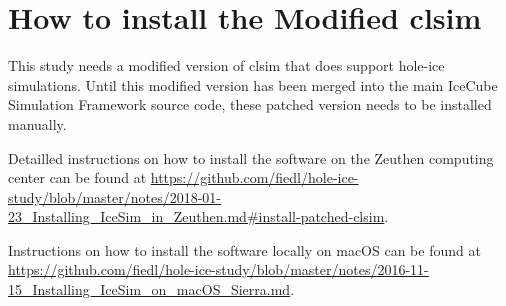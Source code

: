 
\section{How to install the Modified clsim}
\label{sec:howtoclsim}

This study needs a modified version of clsim that does support hole-ice simulations. Until this modified version has been merged into the main IceCube Simulation Framework source code, these patched version needs to be installed manually.


Detailled instructions on how to install the software on the Zeuthen computing center can be found at \url{https://github.com/fiedl/hole-ice-study/blob/master/notes/2018-01-23_Installing_IceSim_in_Zeuthen.md#install-patched-clsim}.

Instructions on how to install the software locally on macOS can be found at \url{https://github.com/fiedl/hole-ice-study/blob/master/notes/2016-11-15_Installing_IceSim_on_macOS_Sierra.md}.